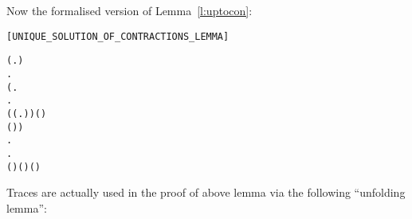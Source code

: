 Now the formalised version of Lemma~\ref{l:uptocon}:
\hfill{\texttt{[UNIQUE_SOLUTION_OF_CONTRACTIONS_LEMMA]}\vspace{-1em}
\begin{alltt}
\begin{small}
\HOLTokenTurnstile{} (\HOLSymConst{\HOLTokenExists{}}.   \HOLSymConst{\HOLTokenConj{}}  \HOLSymConst{\HOLTokenContracts{}}   \HOLSymConst{\HOLTokenConj{}}  \HOLSymConst{\HOLTokenContracts{}}  ) \HOLSymConst{\HOLTokenImp{}}
   \HOLSymConst{\HOLTokenForall{}}.
         \HOLSymConst{\HOLTokenImp{}}
       (\HOLSymConst{\HOLTokenForall{}} .
              \HOLTokenWeakTransBegin{} \HOLTokenWeakTransEnd {} \HOLSymConst{\HOLTokenImp{}}
            \HOLSymConst{\HOLTokenExists{}}.
                  \HOLSymConst{\HOLTokenConj{}}  \HOLSymConst{\HOLTokenContracts{}}   \HOLSymConst{\HOLTokenConj{}}
                ( \HOLSymConst{\HOLTokenRCompose{}} (\HOLTokenLambda{} .  \HOLTokenWeakTransBegin{} \HOLTokenWeakTransEnd {})) ( )
                  ( )) \HOLSymConst{\HOLTokenConj{}}
       \HOLSymConst{\HOLTokenForall{}}.
             \HOLTokenWeakTransBegin\HOLSymConst{\ensuremath{\tau}}\HOLTokenWeakTransEnd {} \HOLSymConst{\HOLTokenImp{}}
           \HOLSymConst{\HOLTokenExists{}}.
                 \HOLSymConst{\HOLTokenConj{}}  \HOLSymConst{\HOLTokenContracts{}}   \HOLSymConst{\HOLTokenConj{}}
               ( \HOLSymConst{\HOLTokenRCompose{}} ) ( ) ( )
\end{small}
\end{alltt}
\vspace{-1em}
Traces are actually used in the proof of above lemma via 
the following ``unfolding lemma'':\vspace{-1em}
}
